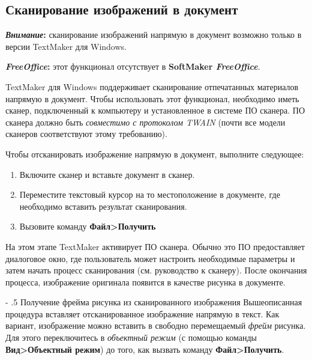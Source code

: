 ﻿\documentclass[a4paper,10pt]{article}
\makeatletter
\renewcommand\paragraph{%
   \@startsection{paragraph}{4}{0mm}%
      {-\baselineskip}%
      {.5\baselineskip}%
      {\normalfont\normalsize\bfseries}}
\makeatother
\begin{document}
\subsection{Сканирование изображений в документ}
\begin{mdframed}[backgroundcolor=blue!10]
\textbf{\textit{Внимание}:} сканирование изображений напрямую в документ возможно только в версии TextMaker для Windows.
\end{mdframed}

\begin{mdframed}[backgroundcolor=pink!50]
\textbf{\textit{FreeOffice}:} этот функционал отсутствует в \textbf{SoftMaker \textit{FreeOffice}}.
\end{mdframed}

TextMaker для Windows поддерживает сканирование отпечатанных материалов напрямую в документ. Чтобы использовать этот функционал, необходимо иметь сканер, подключенный к компьютеру и установленное в системе ПО сканера. ПО сканера должно быть \textit{совместимо с протоколом TWAIN} (почти все модели сканеров соответствуют этому требованию).

Чтобы отсканировать изображение напрямую в документ, выполните следующее:

\begin{enumerate}
 \item Включите сканер и вставьте документ в сканер.
 \item Переместите текстовый курсор на то местоположение в документе, где необходимо вставить результат сканирования.
 \item Вызовите команду \textbf{Файл>Получить}
\end{enumerate}

На этом этапе TextMaker активирует ПО сканера. Обычно это ПО предоставляет диалоговое окно, где пользователь может настроить необходимые параметры и затем начать процесс сканирования (см. руководство к сканеру). После окончания процесса, изображение оригинала появится в качестве рисунка в документе.

\paragraph{Получение фрейма рисунка из сканированного изображения}
Вышеописанная процедура вставляет отсканированное изображение напрямую в текст. Как вариант, изображение можно вставить в свободно перемещаемый \textit{фрейм} рисунка. Для этого переключитесь в \textit{объектный режим} (с помощью команды \textbf{Вид>Объектный режим}) до того, как вызвать команду \textbf{Файл>Получить}.
\end{document}
